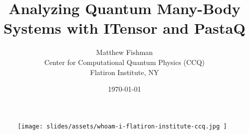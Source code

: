 \documentclass{beamer}
\title{
  \centering
  Analyzing Quantum Many-Body Systems with ITensor and PastaQ
}
\author{
  \centering
  Matthew Fishman \\
  Center for Computational Quantum Physics (CCQ) \\
  Flatiron Institute, NY \\
  \myhref{mtfishman.github.io}{https://mtfishman.github.io/}
}
\date{\today}
\begin{document}
\begin{frame}

  \begin{center}

    \maketitle

  \end{center}

  \begin{figure}[T]

      \centering
      \texttt{[image: 
        slides/assets/whoam-i-flatiron-institute-ccq.jpg
      ]}

  \end{figure}

\end{frame}































\end{document}
